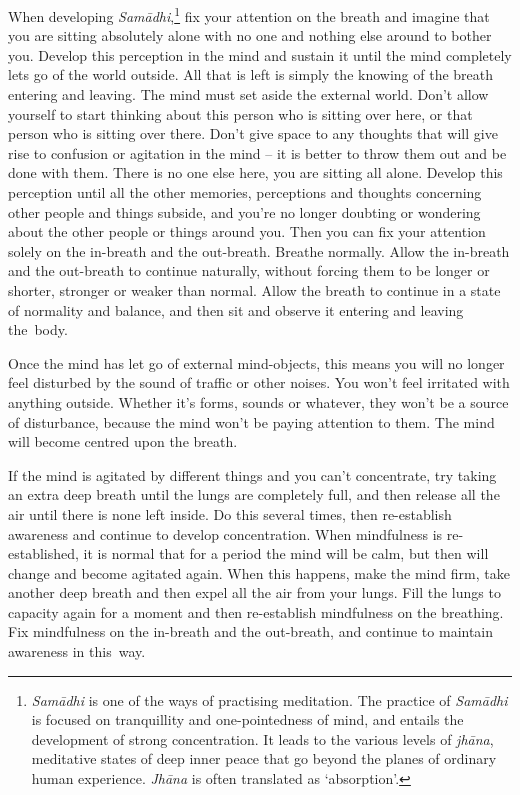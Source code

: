 
When developing \textit{Sam\=adhi},\footnote{\textit{Sam\=adhi} is one of the ways of practising meditation. The practice of \textit{Sam\=adhi} is focused on tranquillity and one-pointedness of mind, and entails the development of strong concentration. It leads to the various levels of \textit{jh\=ana}, meditative states of deep inner peace that go beyond the planes of ordinary human experience. \textit{Jh\=ana} is often translated as `absorption'.} fix your attention on the breath and imagine that you are sitting absolutely alone with no one and nothing else around to bother you. Develop this perception in the mind and sustain it until the mind completely lets go of the world outside. All that is left is simply the knowing of the breath entering and leaving. The mind must set aside the external world. Don't allow yourself to start thinking about this person who is sitting over here, or that person who is sitting over there. Don't give space to any thoughts that will give rise to confusion or agitation in the mind -- it is better to throw them out and be done with them. There is no one else here, you are sitting all alone. Develop this perception until all the other memories, perceptions and thoughts concerning other people and things subside, and you're no longer doubting or wondering about the other people or things around you. Then you can fix your attention solely on the in-breath and the out-breath. Breathe normally. Allow the in-breath and the out-breath to continue naturally, without forcing them to be longer or shorter, stronger or weaker than normal. Allow the breath to continue in a state of normality and balance, and then sit and observe it entering and leaving the~body.

Once the mind has let go of external mind-objects, this means you will no longer feel disturbed by the sound of traffic or other noises. You won't feel irritated with anything outside. Whether it's forms, sounds or whatever, they won't be a source of disturbance, because the mind won't be paying attention to them. The mind will become centred upon the breath.

If the mind is agitated by different things and you can't concentrate, try taking an extra deep breath until the lungs are completely full, and then release all the air until there is none left inside. Do this several times, then re-establish awareness and continue to develop concentration. When mindfulness is re-established, it is normal that for a period the mind will be calm, but then will change and become agitated again. When this happens, make the mind firm, take another deep breath and then expel all the air from your lungs. Fill the lungs to capacity again for a moment and then re-establish mindfulness on the breathing. Fix mindfulness on the \mbox{in-breath} and the out-breath, and continue to maintain awareness in this~way.

